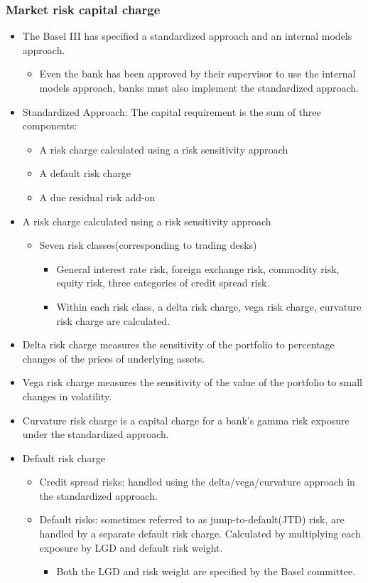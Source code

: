 \subsubsection{Market risk capital charge}
\begin{itemize}
\item The Basel III has specified a standardized approach and an internal models approach.
    \begin{itemize}
    \item Even the bank has been approved by their supervisor to use the internal models approach, banks must also implement the standardized approach.
    \end{itemize}
\item Standardized Approach: The capital requirement is the sum of three components:
    \begin{itemize}
    \item A risk charge calculated using a risk sensitivity approach
    \item A default risk charge
    \item A due residual risk add-on
    \end{itemize}
\item A risk charge calculated using a risk sensitivity approach
    \begin{itemize}
    \item Seven risk classes(corresponding to trading desks)
        \begin{itemize}
        \item General interest rate risk, foreign exchange risk, commodity risk, equity risk, three categories of credit spread risk.
        \item Within each risk class, a delta risk charge, vega risk charge, curvature risk charge are calculated.
        \end{itemize}
    \end{itemize}

\item Delta risk charge measures the sensitivity of the portfolio to percentage changes of the prices of underlying assets.
\item Vega risk charge measures the sensitivity of the value of the portfolio to small changes in volatility.
\item Curvature risk charge is a capital charge for a bank's gamma risk exposure under the standardized approach.
\item Default risk charge
    \begin{itemize}
    \item Credit spread risks: handled using the delta/vega/curvature approach in the standardized approach.
    \item  Default risks: sometimes referred to as jump-to-default(JTD) risk, are handled by a separate default risk charge. Calculated by multiplying each exposure by LGD and default risk weight.
        \begin{itemize}
        \item Both the LGD and risk weight are specified by the Basel committee.
        \end{itemize}
    \end{itemize}


\end{itemize}
